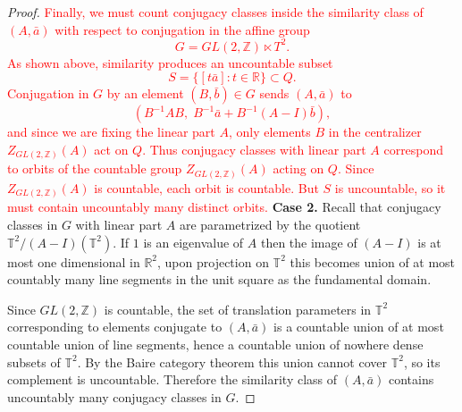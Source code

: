 \documentclass[12pt]{amsart}
\theoremstyle{plain}
\theoremstyle{definition}
\theoremstyle{remark}
\begin{document}
\begin{proof}
\textcolor{red}{Finally, we must count conjugacy classes inside the similarity class of $(A,\bar a)$
with respect to conjugation in the affine group
\[
G = GL(2,\mathbb Z)\ltimes T^2.
\]
As shown above, similarity produces an uncountable subset
\[
S = \{[t\bar a] : t\in\mathbb R\} \subset Q.
\]
Conjugation in $G$ by an element $(B,\bar b)\in G$ sends $(A,\bar a)$ to
\[
(B^{-1}AB,\; B^{-1}\bar a + B^{-1}(A-I)\bar b),
\]}
\textcolor{red}{and since we are fixing the linear part $A$, only elements $B$ in the centralizer
$Z_{GL(2,\mathbb Z)}(A)$ act on $Q$.
Thus conjugacy classes with linear part $A$ correspond to orbits of the countable group
$Z_{GL(2,\mathbb Z)}(A)$ acting on $Q$.
Since $Z_{GL(2,\mathbb Z)}(A)$ is countable, each orbit is countable. 
But $S$ is uncountable, so it must contain uncountably many distinct orbits.}
\fi 
\noindent
\textbf{Case 2.}
 Recall that  conjugacy classes in $G$ with linear part $A$ are parametrized by the quotient $\mathbb T^2 / (A-I)(\mathbb T^2)$. If $1$ is an eigenvalue of $A$ then the image of $(A-I)$ is at most one dimensional in $\mathbb{R}^2$, upon projection on $\mathbb{T}^2$ this becomes union of at most countably many line segments in the unit square as the  fundamental domain. 
 
 Since $GL(2,\mathbb{Z})$ is countable, the set of translation parameters in $\mathbb{T}^2$ corresponding to elements conjugate to $(A,\bar a)$ is a countable union of at most countable union of line segments, hence a countable union of nowhere dense subsets of $\mathbb{T}^2$. By the Baire category theorem this union cannot cover $\mathbb{T}^2$, so its complement is uncountable. Therefore the similarity class of $(A,\bar a)$ contains uncountably many conjugacy classes in $G$.\end{proof}

\end{document}
